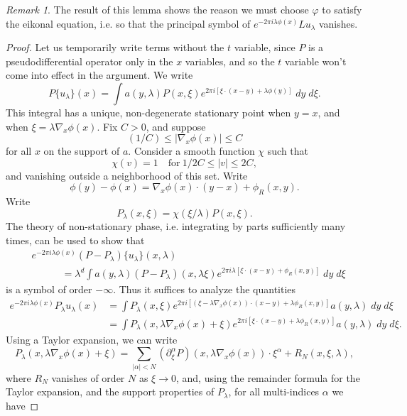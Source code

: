 \documentclass{article}
\theoremstyle{plain}
\theoremstyle{remark}
\newtheorem*{remark}{Remark}
\theoremstyle{definition}
\begin{document}
\begin{remark}
	The result of this lemma shows the reason we must choose $\varphi$ to satisfy the eikonal equation, i.e. so that the principal symbol of $e^{-2 \pi i \lambda \phi(x)} L u_\lambda$ vanishes.
\end{remark}

\begin{proof}
	Let us temporarily write terms without the $t$ variable, since $P$ is a pseudodifferential operator only in the $x$ variables, and so the $t$ variable won't come into effect in the argument. We write
	\[ P \{ u_\lambda \} (x) = \int a(y,\lambda) P(x, \xi) e^{2 \pi i [ \xi \cdot (x - y) + \lambda \phi(y) ]}\; dy\; d\xi. \]
	This integral has a unique, non-degenerate stationary point when $y = x$, and when $\xi = \lambda \nabla_x \phi(x)$. Fix $C > 0$, and suppose
	\[ (1/C) \leq |\nabla_x \phi(x)| \leq C \]
	for all $x$ on the support of $a$. Consider a smooth function $\chi$ such that
	\[ \chi(v) = 1 \quad\text{for}\ 1/2C \leq |v| \leq 2C, \]
	and vanishing outside a neighborhood of this set. Write
	\[ \phi(y) - \phi(x) = \nabla_x \phi(x) \cdot (y - x) + \phi_R(x,y). \]
	Write
	\[ P_\lambda(x,\xi) = \chi(\xi / \lambda) P(x,\xi). \]
	The theory of non-stationary phase, i.e. integrating by parts sufficiently many times, can be used to show that
	\begin{align*}
		& e^{- 2 \pi i \lambda \phi(x) } (P - P_\lambda) \{ u_\lambda \} (x,\lambda)\\
		& \quad\quad\quad = \lambda^d \int a(y,\lambda) (P - P_\lambda)(x,\lambda \xi) e^{2 \pi i \lambda [ \xi \cdot (x - y) + \phi_R(x,y) ]}\; dy\; d\xi
	\end{align*}
	is a symbol of order $-\infty$. Thus it suffices to analyze the quantities
	\begin{align*}
		e^{-2 \pi i \lambda \phi(x)} P_\lambda u_\lambda(x) &= \int P_\lambda(x, \xi) e^{2 \pi i [ (\xi - \lambda \nabla_x \phi(x)) \cdot (x - y) + \lambda \phi_R(x,y) ]} a(y, \lambda)\; dy\; d\xi\\
		&= \int P_\lambda(x, \lambda \nabla_x \phi(x) + \xi) e^{2 \pi i [ \xi \cdot (x - y) + \lambda \phi_R(x,y) ]} a(y,\lambda)\; dy\; d\xi.
	\end{align*}
	Using a Taylor expansion, we can write
	\[ P_\lambda(x, \lambda \nabla_x \phi(x) + \xi) = \sum_{|\alpha| < N} (\partial_\xi^\alpha P)(x, \lambda \nabla_x \phi(x)) \cdot \xi^\alpha + R_N(x,\xi,\lambda), \]
	where $R_N$ vanishes of order $N$ as $\xi \to 0$, and, using the remainder formula for the Taylor expansion, and the support properties of $P_\lambda$, for all multi-indices $\alpha$ we have

\end{proof}
\end{document}
